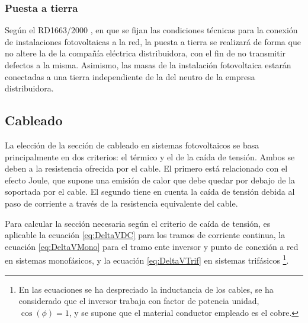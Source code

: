 \subsubsection{Puesta a tierra}

Según el RD1663/2000 \citep{RealDecreto2000}, en que se fijan las
condiciones técnicas para la conexión de instalaciones fotovoltaicas
a la red, la puesta a tierra se realizará de forma que no altere la
de la compañía eléctrica distribuidora, con el fin de no transmitir
defectos a la misma. Asimismo, las masas de la instalación fotovoltaica
estarán conectadas a una tierra independiente de la del neutro de
la empresa distribuidora.


\subsection{Cableado}

La elección de la sección de cableado en sistemas fotovoltaicos se
basa principalmente en dos criterios: el térmico y el de la caída de
tensión. Ambos se deben a la resistencia ofrecida por el cable.  El
primero está relacionado con el efecto Joule, que supone una emisión
de calor que debe quedar por debajo de la soportada por el cable.  El
segundo tiene en cuenta la caída de tensión debida al paso de
corriente a través de la resistencia equivalente del cable.

Para calcular la sección necesaria según el criterio de caída de
tensión, es aplicable la ecuación \ref{eq:DeltaVDC} para los tramos de
corriente continua, la ecuación \ref{eq:DeltaVMono} para el tramo ente
inversor y punto de conexión a red en sistemas monofásicos, y la
ecuación \ref{eq:DeltaVTrif} en sistemas trifásicos%
\footnote{En las ecuaciones se ha despreciado la inductancia de los
  cables, se ha considerado que el inversor trabaja con factor de
  potencia unidad,
  $\cos(\phi)=1$, y se supone que el material
  conductor empleado es el cobre. %
}.

